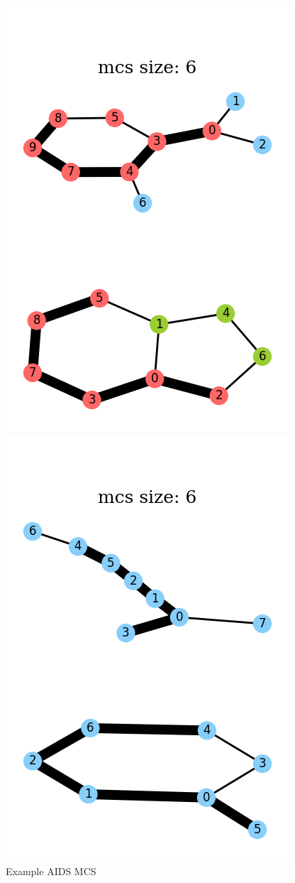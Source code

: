\begin{figure}[!tbp]
    \centering
    \begin{minipage}[b]{0.4\textwidth}
        \includegraphics{figures/mcs-example-aids.png}
        \caption{Example AIDS MCS}
        \label{fig:aids-mcs}
    \end{minipage}
    \hfill
    \begin{minipage}[b]{0.4\textwidth}
        \includegraphics{figures/mcs-example-linux.png}

\end{minipage}
\end{figure}
